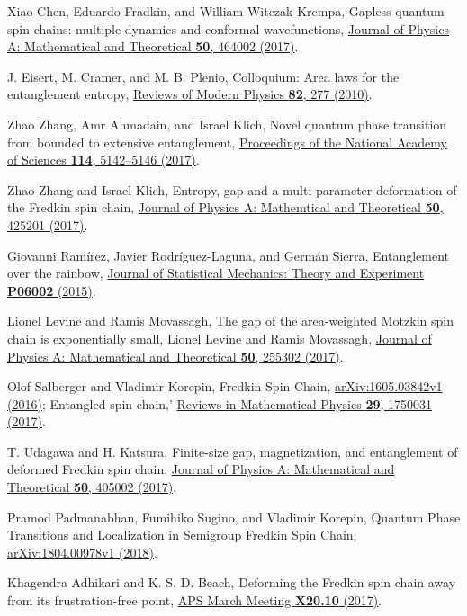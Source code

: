 \documentclass[aps,pra,twocolumn,groupaddress,showpacs]{revtex4-1}
\newcommand{\linkdoi}[2]{\href{http://dx.doi.org/#2}{#1}}
\newcommand{\linkarxiv}[2]{\href{http://arxiv.org/abs/#2}{#1}}
\newcommand{\linkapsmeeting}[2]{\href{http://meetings.aps.org/Meeting/#2}
{#1}}
\begin{document}
\begin{thebibliography}{99}
Xiao Chen, Eduardo Fradkin, and William Witczak-Krempa,
Gapless quantum spin chains: multiple dynamics and conformal wavefunctions,
\linkdoi{Journal of Physics A: Mathematical and Theoretical {\bf 50}, 464002 (2017)}
{10.1088/1751-8121/aa8dbc}.

J. Eisert, M. Cramer, and M. B. Plenio,
Colloquium: Area laws for the entanglement entropy,
\linkdoi{Reviews of Modern Physics {\bf 82}, 277 (2010)}
{10.1103/RevModPhys.82.277}.

Zhao Zhang, Amr Ahmadain, and Israel Klich,
Novel quantum phase transition from bounded to extensive entanglement,
\linkdoi{Proceedings of the National Academy of Sciences {\bf 114}, 5142--5146 (2017)}
{10.1073/pnas.1702029114}.

Zhao Zhang and Israel Klich,
Entropy, gap and a multi-parameter deformation of the Fredkin spin chain,
\linkdoi{Journal of Physics A: Mathemtical and Theoretical {\bf 50}, 425201 (2017)}
{10.1088/1751-8121/aa866e}.

Giovanni Ram\'irez, Javier Rodr\'iguez-Laguna, and Germ\'an Sierra,
Entanglement over the rainbow,
\linkdoi{Journal of Statistical Mechanics: Theory and Experiment
{\bf P06002} (2015)}
{10.1088/1742-5468/2015/06/P06002}.

Lionel Levine and Ramis Movassagh,
The gap of the area-weighted Motzkin spin chain is exponentially small,
Lionel Levine and Ramis Movassagh,
\linkdoi{Journal of Physics A: Mathematical and Theoretical
{\bf 50}, 255302 (2017)}
{10.1088/1751-8121/aa6cc4}.

Olof Salberger and Vladimir Korepin,
Fredkin Spin Chain,
\linkarxiv{arXiv:1605.03842v1 (2016)}
{1605.03842}; 
Entangled spin chain,'
\linkdoi{Reviews in Mathematical Physics {\bf 29}, 1750031 (2017)}
{10.1142/S0129055X17500313}.

T. Udagawa and H. Katsura, 
Finite-size gap, magnetization, and entanglement of deformed Fredkin spin chain,
\linkdoi{Journal of Physics A: Mathematical and Theoretical {\bf 50}, 405002 (2017)}
{10.1088/1751-8121/aa85b5}.

Pramod Padmanabhan, Fumihiko Sugino, and Vladimir Korepin,
Quantum Phase Transitions and Localization in Semigroup Fredkin Spin Chain,
\linkarxiv{arXiv:1804.00978v1 (2018)}{1804.00978}.

Khagendra Adhikari and K. S. D. Beach,
Deforming the Fredkin spin chain away from its frustration-free point,
\linkapsmeeting{APS March Meeting {\bf X20.10} (2017)}
{MAR17/Session/X20.10}.


\end{thebibliography}
\end{document}
